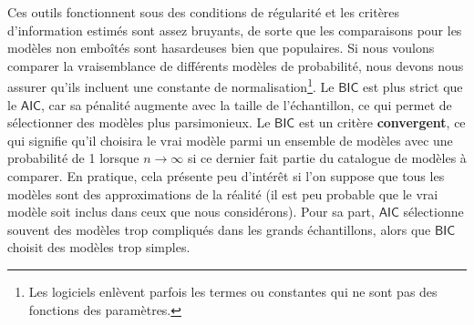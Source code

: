 \documentclass[
  11pt,
  letterpaper,
]{scrbook}
\theoremstyle{definition}
\theoremstyle{plain}
\theoremstyle{definition}
\theoremstyle{plain}
\theoremstyle{remark}
\begin{document}
Ces outils fonctionnent sous des conditions de régularité et les
critères d'information estimés sont assez bruyants, de sorte que les
comparaisons pour les modèles non emboîtés sont hasardeuses bien que
populaires. Si nous voulons comparer la vraisemblance de différents
modèles de probabilité, nous devons nous assurer qu'ils incluent une
constante de normalisation\footnote{Les logiciels enlèvent parfois les
  termes ou constantes qui ne sont pas des fonctions des paramètres.}.
Le \(\mathsf{BIC}\) est plus strict que le \(\mathsf{AIC}\), car sa
pénalité augmente avec la taille de l'échantillon, ce qui permet de
sélectionner des modèles plus parsimonieux. Le \(\mathsf{BIC}\) est un
critère \textbf{convergent}, ce qui signifie qu'il choisira le vrai
modèle parmi un ensemble de modèles avec une probabilité de 1 lorsque
\(n \to \infty\) si ce dernier fait partie du catalogue de modèles à
comparer. En pratique, cela présente peu d'intérêt si l'on suppose que
tous les modèles sont des approximations de la réalité (il est peu
probable que le vrai modèle soit inclus dans ceux que nous considérons).
Pour sa part, \(\mathsf{AIC}\) sélectionne souvent des modèles trop
compliqués dans les grands échantillons, alors que \(\mathsf{BIC}\)
choisit des modèles trop simples.
\end{document}
